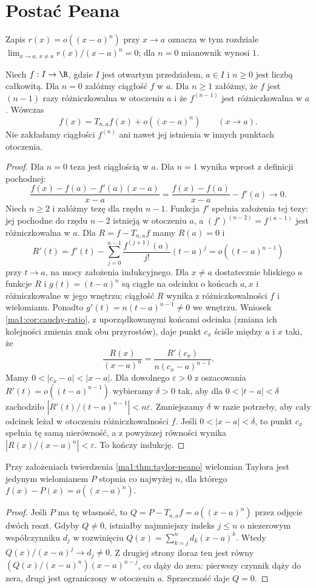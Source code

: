 \section{Postać Peana}
Zapis $r(x)=o((x-a)^n)$ przy $x\to a$ oznacza w tym rozdziale
$\lim_{x\to a,\,x\ne a}r(x)/(x-a)^n=0$; dla $n=0$ mianownik wynosi $1$.

\begin{twierdzenie}
\label{ma1:thm:taylor-peano}
Niech $f:I\to\R$, gdzie $I$ jest otwartym przedziałem, $a\in I$ i $n\ge0$ jest liczbą całkowitą. Dla $n=0$ załóżmy ciągłość $f$ w $a$. Dla $n\ge1$ załóżmy, że $f$ jest $(n-1)$ razy różniczkowalna w otoczeniu $a$ i że $f^{(n-1)}$ jest różniczkowalna w $a$. Wówczas
\[
 f(x)=T_{n,a}f(x)+o((x-a)^n)\qquad(x\to a).
\]
Nie zakładamy ciągłości $f^{(n)}$ ani nawet jej istnienia w innych punktach otoczenia.
\end{twierdzenie}
\begin{proof}
Dla $n=0$ teza jest ciągłością w $a$. Dla $n=1$ wynika wprost z definicji pochodnej:
\[
 \frac{f(x)-f(a)-f'(a)(x-a)}{x-a}
 =\frac{f(x)-f(a)}{x-a}-f'(a)\longrightarrow0.
\]
Niech $n\ge2$ i załóżmy tezę dla rzędu $n-1$. Funkcja $f'$ spełnia założenia tej tezy: jej pochodne do rzędu $n-2$ istnieją w otoczeniu $a$, a $(f')^{(n-2)}=f^{(n-1)}$ jest różniczkowalna w $a$. Dla $R=f-T_{n,a}f$ mamy $R(a)=0$ i
\[
 R'(t)=f'(t)-\sum_{j=0}^{n-1}\frac{f^{(j+1)}(a)}{j!}(t-a)^j
       =o((t-a)^{n-1})
\]
przy $t\to a$, na mocy założenia indukcyjnego. Dla $x\ne a$ dostatecznie bliskiego $a$ funkcje $R$ i $g(t)=(t-a)^n$ są ciągłe na odcinku o końcach $a,x$ i różniczkowalne w jego wnętrzu; ciągłość $R$ wynika z różniczkowalności $f$ i wielomianu. Ponadto $g'(t)=n(t-a)^{n-1}\ne0$ we wnętrzu. Wniosek \ref{ma1:cor:cauchy-ratio}, z uporządkowanymi końcami odcinka (zmiana ich kolejności zmienia znak obu przyrostów), daje punkt $c_x$ ściśle między $a$ i $x$ taki, że
\[
 \frac{R(x)}{(x-a)^n}=\frac{R'(c_x)}{n(c_x-a)^{n-1}}.
\]
Mamy $0<|c_x-a|<|x-a|$. Dla dowolnego $\varepsilon>0$ z oszacowania $R'(t)=o((t-a)^{n-1})$ wybieramy $\delta>0$ tak, aby dla $0<|t-a|<\delta$ zachodziło $|R'(t)/(t-a)^{n-1}|<n\varepsilon$. Zmniejszamy $\delta$ w razie potrzeby, aby cały odcinek leżał w otoczeniu różniczkowalności $f$. Jeśli $0<|x-a|<\delta$, to punkt $c_x$ spełnia tę samą nierówność, a z powyższej równości wynika $|R(x)/(x-a)^n|<\varepsilon$. To kończy indukcję.
\end{proof}
\begin{wniosek}
\label{ma1:cor:taylor-peano-unique}
Przy założeniach twierdzenia \ref{ma1:thm:taylor-peano} wielomian Taylora jest jedynym wielomianem $P$ stopnia co najwyżej $n$, dla którego $f(x)-P(x)=o((x-a)^n)$.
\end{wniosek}
\begin{proof}
Jeśli $P$ ma tę własność, to $Q=P-T_{n,a}f=o((x-a)^n)$ przez odjęcie dwóch reszt. Gdyby $Q\ne0$, istniałby najmniejszy indeks $j\le n$ o niezerowym współczynniku $d_j$ w rozwinięciu $Q(x)=\sum_{k=j}^n d_k(x-a)^k$. Wtedy $Q(x)/(x-a)^j\to d_j\ne0$. Z drugiej strony iloraz ten jest równy $(Q(x)/(x-a)^n)(x-a)^{n-j}$, co dąży do zera: pierwszy czynnik dąży do zera, drugi jest ograniczony w otoczeniu $a$. Sprzeczność daje $Q=0$.
\end{proof}

